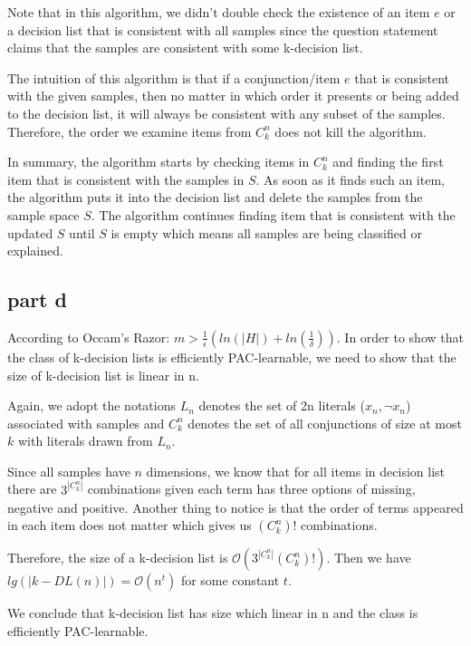 Note that in this algorithm, we didn't double check the existence of an item $e$ or a decision list that is consistent with all samples since the question statement claims that the samples are consistent with some k-decision list.

The intuition of this algorithm is that if a conjunction/item $e$ that is consistent with the given samples, then no matter in which order it presents or being added to the decision list, it will always be consistent with any subset of the samples. Therefore, the order we examine items from $C_k^n$ does not kill the algorithm.

In summary, the algorithm starts by checking items in $C_k^n$ and finding the first item that is consistent with the samples in $S$. As soon as it finds such an item, the algorithm puts it into the decision list and delete the samples from the sample space $S$. The algorithm continues finding item that is consistent with the updated $S$ until $S$ is empty which means all samples are being classified or explained.

\subsection{part d}

According to Occam's Razor: $m>\frac{1}{\epsilon}(ln(|H|)+ln(\frac{1}{\delta}))$. In order to show that the class of k-decision lists is efficiently PAC-learnable, we need to show that the size of k-decision list is linear in n.

Again, we adopt the notations $L_n$ denotes the set of 2n literals ($x_n, \neg{x_n}$) associated with samples and $C_k^n$ denotes the set of all conjunctions of size at most $k$ with literals drawn from $L_n$.

Since all samples have $n$ dimensions, we know that for all items in decision list there are $3^{|C_k^n|}$ combinations given each term has three options of missing, negative and positive. Another thing to notice is that the order of terms appeared in each item does not matter which gives us $(C_k^n)!$ combinations.

Therefore, the size of a k-decision list is $\mathcal{O}(3^{|C_k^n|}(C_k^n)!)$. Then we have $lg(|k-DL(n)|) = \mathcal{O}(n^t)$ for some constant $t$.

We conclude that k-decision list has size which linear in n and the class is efficiently PAC-learnable.










